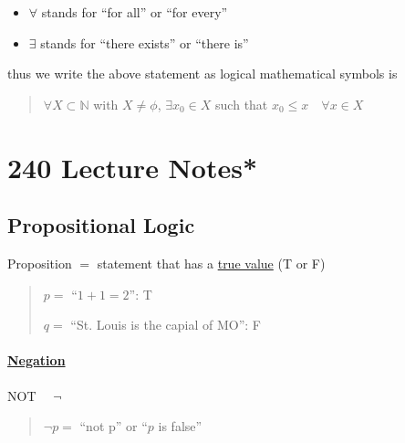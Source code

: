 \documentclass[../main.tex]{subfiles}
\begin{document}
\begin{itemize}
    \item $\forall$ stands for ``for all'' or ``for every''
    \item $\exists$ stands for ``there exists'' or ``there is''
\end{itemize}

thus we write the above statement as logical mathematical symbols is

\begin{quote}
    $\forall X \subset \mathbb{N}$ with $X \neq \phi$, $\exists x_0 \in X$ such that
    $x_0 \leq x \quad \forall x \in X$
\end{quote}


































\newpage

\section*{240 Lecture Notes*}

\subsection{Propositional Logic}

Proposition $=$ statement that has a \underline{true value} (T or F)
\begin{quote}
    $p = $ ``$1 + 1 = 2$'': T

    $q = $ ``St. Louis is the capial of MO'': F
\end{quote}

\paragraph{\underline{Negation}} NOT $\quad \neg$

\begin{quote}
    $\neg p =$ ``not p'' or ``$p$ is false''
\end{quote}
\end{document}
